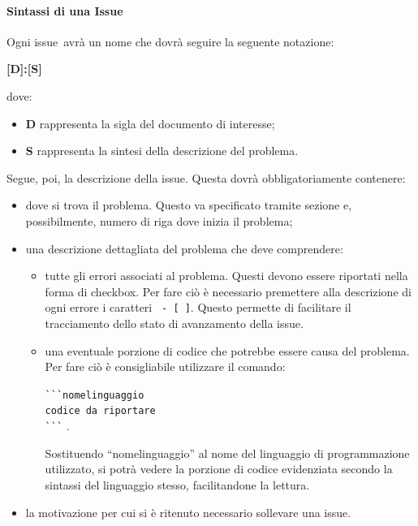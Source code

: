 \documentclass[../NormeProgetto.text]{subfiles}
\begin{document}
		\paragraph{Sintassi di una Issue}
			Ogni issue\g\ avrà un nome che dovrà seguire la seguente notazione: \begin{center}\textbf{[D]:[S]}\end{center} dove:
				\begin{itemize} 
					\item \textbf{D} rappresenta la sigla del documento di interesse;
					\item \textbf{S} rappresenta la sintesi della descrizione del problema.
				\end{itemize}
				Segue, poi, la descrizione della issue\g. Questa dovrà obbligatoriamente contenere:
			\begin{itemize} 
				\item dove si trova il problema. Questo va specificato tramite sezione e, possibilmente, numero di riga dove inizia il problema;
				\item una descrizione dettagliata del problema che deve comprendere:
				\begin{itemize}
					\item tutte gli errori associati al problema. Questi devono essere riportati nella forma di checkbox. Per fare ciò è necessario premettere alla descrizione di ogni errore i caratteri \texttt{ - [ ]}. Questo permette di facilitare il tracciamento dello stato di avanzamento della issue\g.
					\item una eventuale porzione di codice che potrebbe essere causa del problema. Per fare ciò è consigliabile utilizzare il comando: \begin{center} \texttt {\`{}\`{}\`{}nomelinguaggio\\ codice da riportare\\ \`{}\`{}\`{}} .\end{center} Sostituendo ``nomelinguaggio'' al nome del linguaggio di programmazione utilizzato, si potrà vedere la porzione di codice evidenziata secondo la sintassi del linguaggio stesso, facilitandone la lettura.
				\end{itemize}
				\item la motivazione per cui si è ritenuto necessario sollevare una issue\g.
			\end{itemize}
		
\end{document}
